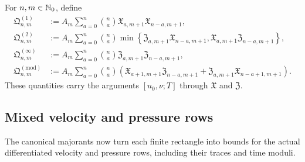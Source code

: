 \begin{definition}
\label{u:def:qc-closed-pressure-majorants}
For \(n,m\in\mathbb N_0\), define
\begin{align}
 \mathfrak Q^{(1)}_{n,m}
 &:={}
 A_m\sum_{a=0}^{n}\binom na
 \mathfrak X_{a,m+1}\mathfrak X_{n-a,m+1},
 \label{u:eq:qc-Q1}\\
 \mathfrak Q^{(2)}_{n,m}
 &:={}
 A_m\sum_{a=0}^{n}\binom na
 \min\left\{
 \mathfrak Z_{a,m+1}\mathfrak X_{n-a,m+1},
 \mathfrak X_{a,m+1}\mathfrak Z_{n-a,m+1}
 \right\},
 \label{u:eq:qc-Q2}\\
 \mathfrak Q^{(\infty)}_{n,m}
 &:={}
 A_m\sum_{a=0}^{n}\binom na
 \mathfrak Z_{a,m+1}\mathfrak Z_{n-a,m+1},
 \label{u:eq:qc-Qinfty}\\
 \mathfrak Q^{(\mathrm{mod})}_{n,m}
 &:={}
 A_m\sum_{a=0}^{n}\binom na
 \left(
 \mathfrak X_{a+1,m+1}\mathfrak Z_{n-a,m+1}
 +\mathfrak Z_{a,m+1}\mathfrak X_{n-a+1,m+1}
 \right).
 \label{u:eq:qc-Qmod}
\end{align}
These quantities carry the arguments \([u_0,\nu;T]\) through
\(\mathfrak X\) and \(\mathfrak Z\).
\end{definition}

\subsection{Mixed velocity and pressure rows}

The canonical majorants now turn each finite rectangle into bounds for the
actual differentiated velocity and pressure rows, including their traces and
time moduli.

